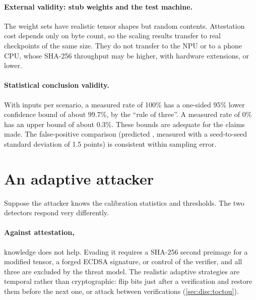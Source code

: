\paragraph{External validity: stub weights and the test machine.} The weight sets have
realistic tensor shapes but random contents. Attestation cost depends only on byte count, so the
scaling results transfer to real checkpoints of the same size. They do not transfer to the NPU
or to a phone CPU, whose SHA-256 throughput may be higher, with hardware extensions, or lower.

\paragraph{Statistical conclusion validity.} With \NPerScenario{} inputs per scenario, a measured
rate of 100\% has a one-sided 95\% lower confidence bound of about 99.7\%, by the ``rule of
three''. A measured rate of 0\% has an upper bound of about 0.3\%. These bounds are adequate for
the claims made. The false-positive comparison (predicted \PredFPRZFour{}, measured \EmpFPRZFour{}
with a seed-to-seed standard deviation of 1.5 points) is consistent within sampling error.

\section{An adaptive attacker}
\label{sec:disc:adaptive}

Suppose the attacker knows the calibration statistics and thresholds. The two detectors respond
very differently.

\paragraph{Against attestation,} knowledge does not help. Evading it requires a SHA-256 second
preimage for a modified tensor, a forged ECDSA signature, or control of the verifier, and all
three are excluded by the threat model. The realistic adaptive strategies are temporal rather than
cryptographic: flip bits just after a verification and restore them before the next one, or
attack between verifications (\cref{sec:disc:toctou}).

